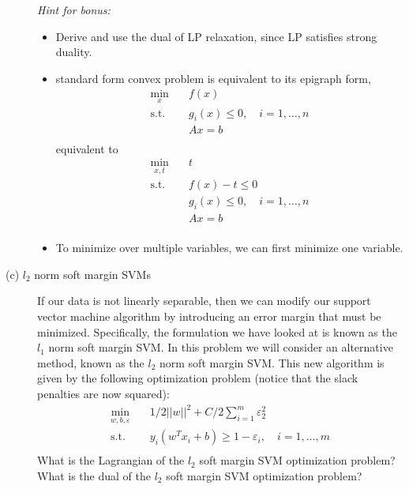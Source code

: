 \documentclass[12pt]{article}
\begin{document}
\begin{description}
	      \textit{Hint for bonus:}
	      \begin{itemize}
		      \item  Derive and use the dual of LP relaxation, since LP satisfies strong duality.
		      \item standard form convex problem is equivalent to its epigraph form, \ie
		            \begin{equation}
			            \begin{aligned}
				            \min_{x} \quad      & f(x)                                     \\
				            \textrm{s.t.} \quad & g_i(x) \le  0    , \quad i= 1, \dots , n \\
				                                & Ax=b                                     \\
			            \end{aligned}
					\end{equation}
					equivalent to 
		            \begin{equation}
			            \begin{aligned}
				            \min_{x,t} \quad    & t                  \\
				            \textrm{s.t.} \quad & f(x) -t \le 0      \\
				            & g_i(x) \le  0    , \quad i= 1, \dots , n \\
				                                & Ax=b               \\
			            \end{aligned}
		            \end{equation}
		      \item To minimize over multiple variables, we  can first minimize one variable.

	      \end{itemize}
	\item[(c) $l_2$ norm soft margin SVMs] If our data is not linearly separable, then we can  modify our
	      support vector machine algorithm by introducing an error margin that must be minimized.
	      Specifically, the formulation we have looked at is known as the $l_1$ norm soft margin SVM.
	      In this problem we will consider an alternative method, known as the $l_2$ norm soft margin
	      SVM. This new algorithm is given by the following optimization problem (notice that the
	      slack penalties are now squared):
	      \begin{equation}
		      \begin{aligned}
			      \min_{w,b,\varepsilon} \quad & 1/2 || w ||^2 + C/2 \sum_{i=1}^{m} \varepsilon_2^2          \\
			      \textrm{s.t.} \quad          & y_i (w^T x_i + b ) \ge 1-\varepsilon_i , \quad i=1,\dots, m \\
		      \end{aligned}
	      \end{equation}
	      What is the Lagrangian of the $l_2$ soft margin SVM optimization problem? What is the dual of the $l_2$ soft margin SVM optimization problem?
\end{description}
\end{document}

